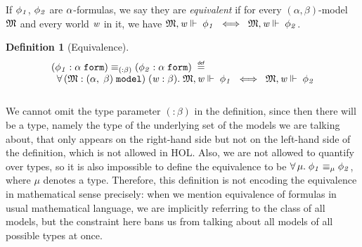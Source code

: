 \documentclass{llncs}
\newtheorem{defn}{Definition}[chapter]
\newenvironment{holmath}{\begin{displaymath}\begin{array}{l}}{\end{array}\end{displaymath}\ignorespacesafterend}
\renewcommand{\HOLinline}[1]{\ensuremath{#1}}
\begin{document}
If \HOLinline{\HOLFreeVar{\ensuremath{\phi\sb{1}}}}, \HOLinline{\HOLFreeVar{\ensuremath{\phi\sb{2}}}} are \HOLinline{\HOLFreeVar{\ensuremath{\alpha}}}-formulas, we say they are \emph{equivalent} if for every $(\alpha,\beta)$-model \HOLinline{\HOLFreeVar{\ensuremath{\mathfrak{M}}}} and every world \HOLinline{\HOLFreeVar{w}} in it, we have \HOLinline{\HOLFreeVar{\ensuremath{\mathfrak{M}}},\HOLFreeVar{w}\ensuremath{\Vdash}\;\HOLFreeVar{\ensuremath{\phi\sb{1}}}\;\HOLSymConst{\HOLTokenEquiv{}}\;\HOLFreeVar{\ensuremath{\mathfrak{M}}},\HOLFreeVar{w}\ensuremath{\Vdash}\;\HOLFreeVar{\ensuremath{\phi\sb{2}}}}.
\begin{defn}[Equivalence]
\begin{holmath}
  (\HOLFreeVar{\ensuremath{\phi\sb{1}}} :\ensuremath{\alpha}\;\HOLTyOp{form})\equiv\sb{({:}\ensuremath{\beta})}(\HOLFreeVar{\ensuremath{\phi\sb{2}}} :\ensuremath{\alpha}\;\HOLTyOp{form})\;\HOLTokenDefEquality{}\\
\;\;\HOLSymConst{\HOLTokenForall{}}(\HOLBoundVar{\ensuremath{\mathfrak{M}}} :(\ensuremath{\alpha},\;\ensuremath{\beta})\;\HOLTyOp{model})\;(\HOLBoundVar{w} :\ensuremath{\beta}).\;\HOLBoundVar{\ensuremath{\mathfrak{M}}},\HOLBoundVar{w}\ensuremath{\Vdash}\;\HOLFreeVar{\ensuremath{\phi\sb{1}}}\;\HOLSymConst{\HOLTokenEquiv{}}\;\HOLBoundVar{\ensuremath{\mathfrak{M}}},\HOLBoundVar{w}\ensuremath{\Vdash}\;\HOLFreeVar{\ensuremath{\phi\sb{2}}}\\[3mm]
\end{holmath}
\end{defn}
We cannot omit the type parameter \HOLinline{({:}\ensuremath{\beta})} in the definition, since then there will be a type, namely the type of the underlying set of the models we are talking about, that only appears on the right-hand side but not on the left-hand side of the definition, which is not allowed in HOL. Also, we are not allowed to quantify over types, so it is also impossible to define the equivalence to be \HOLinline{\HOLSymConst{\HOLTokenForall{}}\HOLBoundVar{\ensuremath{\mu}}.\;\HOLFreeVar{\ensuremath{\phi\sb{1}}}\equiv\sb{\HOLBoundVar{\ensuremath{\mu}}}\HOLFreeVar{\ensuremath{\phi\sb{2}}}}, where $\mu$ denotes a type. Therefore, this definition is not encoding the equivalence in mathematical sense precisely: when we mention equivalence of formulas in usual mathematical language, we are implicitly referring to the class of all models, but the constraint here bans us from talking about all models of all possible types at once.
\end{document}
